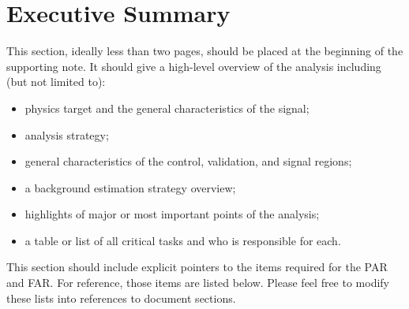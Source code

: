 \section{Executive Summary}

This section, ideally less than two pages, should be placed at the beginning of the supporting note.
It should give a high-level overview of the analysis including (but not limited to):
\begin{itemize}
\item physics target and the general characteristics of the signal;
\item analysis strategy;
\item general characteristics of the control, validation, and signal regions;
\item a background estimation strategy overview;
\item highlights of major or most important points of the analysis;
\item a table or list of all critical tasks and who is responsible for each.
\end{itemize}

This section should include explicit pointers to the items required for the PAR and FAR\@.  For reference, those items are listed below. Please feel free to modify these lists into references to document sections.

